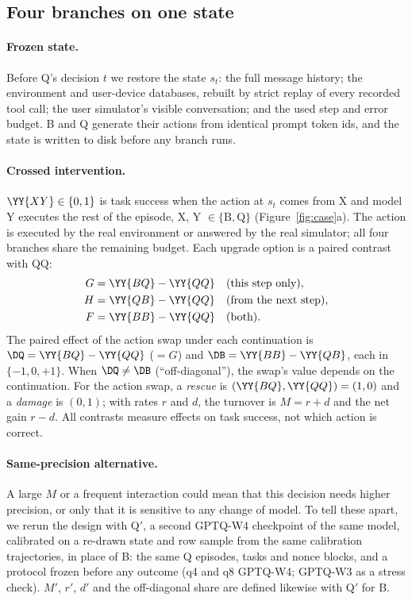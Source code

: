 \subsection{Four branches on one state}
\label{sec:estimands}

\paragraph{Frozen state.} Before Q's decision $t$ we restore the state $s_t$: the full message history; the environment and user-device databases, rebuilt by strict replay of every recorded tool call; the user simulator's visible conversation; and the used step and error budget. B and Q generate their actions from identical prompt token ids, and the state is written to disk before any branch runs.

\paragraph{Crossed intervention.} $\YY{XY}\in\{0,1\}$ is task success when the action at $s_t$ comes from X and model Y executes the rest of the episode, X, Y $\in\{\mathrm{B},\mathrm{Q}\}$ (Figure~\ref{fig:case}a). The action is executed by the real environment or answered by the real simulator; all four branches share the remaining budget. Each upgrade option is a paired contrast with QQ: %
\begin{align*}
G &= \YY{BQ}-\YY{QQ} && \text{(this step only)},\\
H &= \YY{QB}-\YY{QQ} && \text{(from the next step)},\\
F &= \YY{BB}-\YY{QQ} && \text{(both)}.
\end{align*}
The paired effect of the action swap under each continuation is $\DQ=\YY{BQ}-\YY{QQ}$ ($=G$) and $\DB=\YY{BB}-\YY{QB}$, each in $\{-1,0,+1\}$. When $\DQ\neq\DB$ (``off-diagonal''), the swap's value depends on the continuation. For the action swap, a \emph{rescue} is $(\YY{BQ},\YY{QQ})=(1,0)$ and a \emph{damage} is $(0,1)$; with rates $r$ and $d$, the turnover is $M=r+d$ and the net gain $r-d$. All contrasts measure effects on task success, not which action is correct. %

\paragraph{Same-precision alternative.} A large $M$ or a frequent interaction could mean that this decision needs higher precision, or only that it is sensitive to any change of model. To tell these apart, we rerun the design with Q$'$, a second GPTQ-W4 checkpoint of the same model, calibrated on a re-drawn state and row sample from the same calibration trajectories, in place of B: the same Q episodes, tasks and nonce blocks, and a protocol frozen before any outcome (q4 and q8 GPTQ-W4; GPTQ-W3 as a stress check). $M'$, $r'$, $d'$ and the off-diagonal share are defined likewise with Q$'$ for B.


